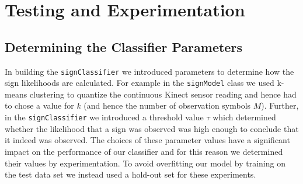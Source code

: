 \chapter{Testing and Experimentation}
\ifpdf
    \graphicspath{{Chapter3/Chapter3Figs/PNG/}{Chapter3/Chapter3Figs/PDF/}{Chapter3/Chapter3Figs/}}
\else
    \graphicspath{{Chapter3/Chapter3Figs/EPS/}{Chapter3/Chapter3Figs/}}
\fi

\section{Determining the Classifier Parameters}
In building the \verb|signClassifier| we introduced parameters to determine how the sign likelihoods are calculated. For example in the \verb|signModel| class we used k-means clustering to quantize the continuous Kinect sensor reading and hence had to chose a value for $k$ (and hence the number of observation symbols $M$). Further, in the \verb|signClassifier| we introduced a threshold value $\tau$ which determined whether the likelihood that a sign was observed was high enough to conclude that it indeed was observed. The choices of these parameter values have a significant impact on the performance of our classifier and for this reason we determined their values by experimentation. To avoid overfitting our model by training on the test data set we instead used a hold-out set for these experiments.

